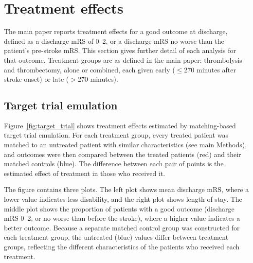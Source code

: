 
\newpage

\section{Treatment effects}

The main paper reports treatment effects for a good outcome at discharge, defined as a discharge mRS of 0--2, or a discharge mRS no worse than the patient's pre-stroke mRS. This section gives further detail of each analysis for that outcome. Treatment groups are as defined in the main paper: thrombolysis and thrombectomy, alone or combined, each given early ($\leq$270 minutes after stroke onset) or late ($>$270 minutes).

\subsection{Target trial emulation}

Figure~\ref{fig:target_trial} shows treatment effects estimated by matching-based target trial emulation. For each treatment group, every treated patient was matched to an untreated patient with similar characteristics (see main Methods), and outcomes were then compared between the treated patients (red) and their matched controls (blue). The difference between each pair of points is the estimated effect of treatment in those who received it.

The figure contains three plots. The left plot shows mean discharge mRS, where a lower value indicates less disability, and the right plot shows length of stay. The middle plot shows the proportion of patients with a good outcome (discharge mRS 0--2, or no worse than before the stroke), where a higher value indicates a better outcome. Because a separate matched control group was constructed for each treatment group, the untreated (blue) values differ between treatment groups, reflecting the different characteristics of the patients who received each treatment.


